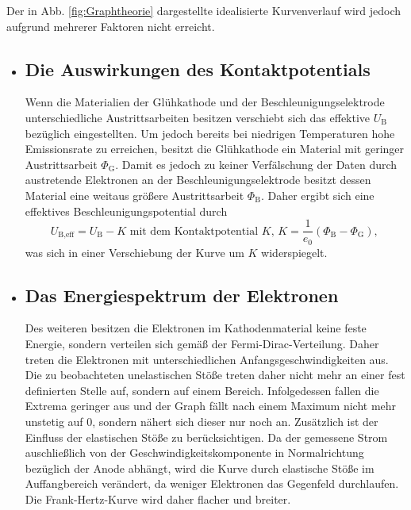 Der in Abb. \ref{fig:Graphtheorie} dargestellte idealisierte Kurvenverlauf wird jedoch
aufgrund mehrerer Faktoren nicht erreicht.


\begin{itemize}
  \item \subsection{Die Auswirkungen des Kontaktpotentials}
  Wenn die Materialien der Glühkathode und der Beschleunigungselektrode unterschiedliche
  Austrittsarbeiten besitzen verschiebt sich das effektive $U_\text{B}$ bezüglich
  eingestellten. Um jedoch bereits bei niedrigen Temperaturen hohe Emissionsrate
  zu erreichen, besitzt die Glühkathode ein Material mit geringer Austrittsarbeit $\Phi_\text{G}$.
  Damit es jedoch zu keiner Verfälschung der Daten durch austretende Elektronen an
  der Beschleunigungselektrode besitzt dessen Material eine weitaus größere Austrittsarbeit
  $\Phi_\text{B}$. Daher ergibt sich eine effektives Beschleunigungspotential durch
  \begin{equation}
    U_\text{B,eff} = U_\text{B} - K \text{ mit dem Kontaktpotential }K\text{, } K = \frac{1}{e_0}\left(\Phi_\text{B} - \Phi _\text{G} \right)\text{, }\label{eq:kontakt}
  \end{equation}
was sich in einer Verschiebung der Kurve um $K$ widerspiegelt.

\item \subsection{Das Energiespektrum der Elektronen}
Des weiteren besitzen die Elektronen im Kathodenmaterial keine feste Energie, sondern
verteilen sich gemäß der Fermi-Dirac-Verteilung. Daher treten die Elektronen mit
unterschiedlichen Anfangsgeschwindigkeiten aus. Die zu beobachteten unelastischen Stöße treten
daher nicht mehr an einer fest definierten Stelle auf, sondern auf einem Bereich.
Infolgedessen fallen die Extrema geringer aus und der Graph fällt nach einem
Maximum nicht mehr unstetig auf 0, sondern nähert sich dieser nur noch an. Zusätzlich
ist der Einfluss der elastischen Stöße zu berücksichtigen. Da der gemessene
Strom auschließlich von der Geschwindigkeitskomponente in Normalrichtung bezüglich
der Anode abhängt, wird die Kurve durch elastische Stöße im Auffangbereich verändert,
da weniger Elektronen das Gegenfeld durchlaufen. Die Frank-Hertz-Kurve wird daher flacher und breiter.



\end{itemize}

